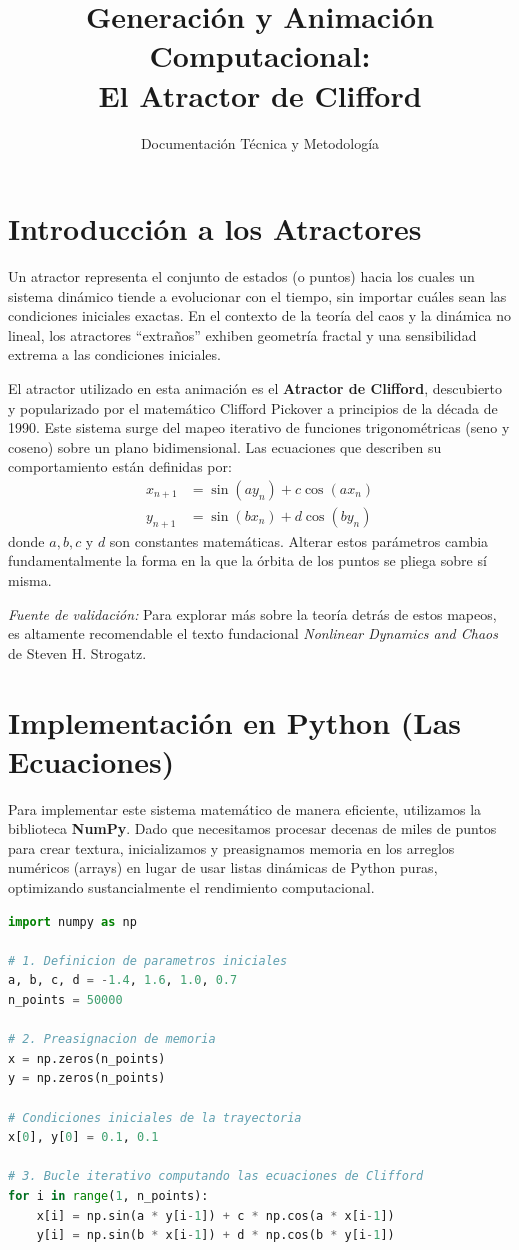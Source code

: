 \documentclass[12pt, a4paper]{article}
\title{Generación y Animación Computacional:\\El Atractor de Clifford}
\author{Documentación Técnica y Metodología}
\date{}
\begin{document}
\maketitle

\section{Introducción a los Atractores}
Un atractor representa el conjunto de estados (o puntos) hacia los cuales un sistema dinámico tiende a evolucionar con el tiempo, sin importar cuáles sean las condiciones iniciales exactas. En el contexto de la teoría del caos y la dinámica no lineal, los atractores ``extraños'' exhiben geometría fractal y una sensibilidad extrema a las condiciones iniciales.

El atractor utilizado en esta animación es el \textbf{Atractor de Clifford}, descubierto y popularizado por el matemático Clifford Pickover a principios de la década de 1990. Este sistema surge del mapeo iterativo de funciones trigonométricas (seno y coseno) sobre un plano bidimensional. Las ecuaciones que describen su comportamiento están definidas por:
\begin{align}
    x_{n+1} &= \sin(a y_n) + c \cos(a x_n) \\
    y_{n+1} &= \sin(b x_n) + d \cos(b y_n)
\end{align}
donde $a, b, c$ y $d$ son constantes matemáticas. Alterar estos parámetros cambia fundamentalmente la forma en la que la órbita de los puntos se pliega sobre sí misma.

\textit{Fuente de validación:} Para explorar más sobre la teoría detrás de estos mapeos, es altamente recomendable el texto fundacional \textit{Nonlinear Dynamics and Chaos} de Steven H. Strogatz.

\section{Implementación en Python (Las Ecuaciones)}
Para implementar este sistema matemático de manera eficiente, utilizamos la biblioteca \textbf{NumPy}. Dado que necesitamos procesar decenas de miles de puntos para crear textura, inicializamos y preasignamos memoria en los arreglos numéricos (arrays) en lugar de usar listas dinámicas de Python puras, optimizando sustancialmente el rendimiento computacional.

\begin{lstlisting}[language=Python]
import numpy as np

# 1. Definicion de parametros iniciales
a, b, c, d = -1.4, 1.6, 1.0, 0.7
n_points = 50000

# 2. Preasignacion de memoria
x = np.zeros(n_points)
y = np.zeros(n_points)

# Condiciones iniciales de la trayectoria
x[0], y[0] = 0.1, 0.1

# 3. Bucle iterativo computando las ecuaciones de Clifford
for i in range(1, n_points):
    x[i] = np.sin(a * y[i-1]) + c * np.cos(a * x[i-1])
    y[i] = np.sin(b * x[i-1]) + d * np.cos(b * y[i-1])
\end{lstlisting}
\end{document}
